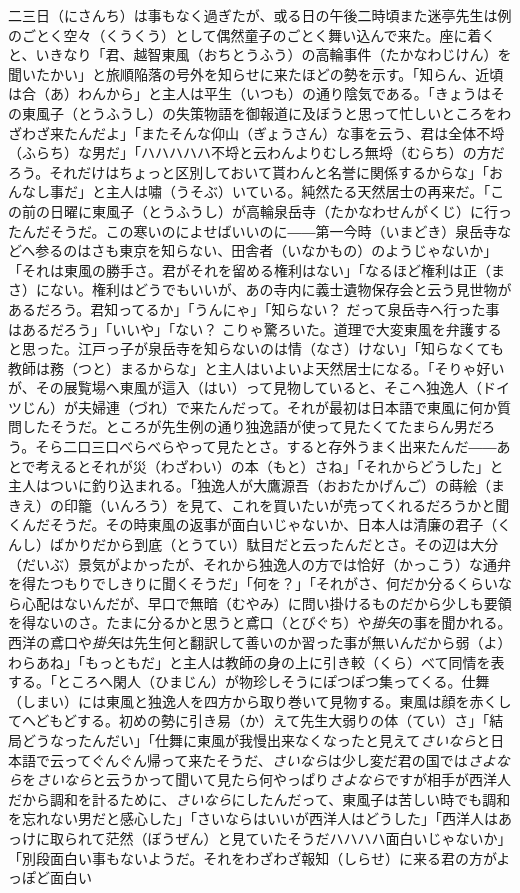 \documentclass{book}
\begin{document}
二三日（にさんち）は事もなく過ぎたが、或る日の午後二時頃また迷亭先生は例のごとく空々（くうくう）として偶然童子のごとく舞い込んで来た。座に着くと、いきなり「君、越智東風（おちとうふう）の高輪事件（たかなわじけん）を聞いたかい」と旅順陥落の号外を知らせに来たほどの勢を示す。「知らん、近頃は合（あ）わんから」と主人は平生（いつも）の通り陰気である。「きょうはその東風子（とうふうし）の失策物語を御報道に及ぼうと思って忙しいところをわざわざ来たんだよ」「またそんな仰山（ぎょうさん）な事を云う、君は全体不埒（ふらち）な男だ」「ハハハハハ不埒と云わんよりむしろ無埒（むらち）の方だろう。それだけはちょっと区別しておいて貰わんと名誉に関係するからな」「おんなし事だ」と主人は嘯（うそぶ）いている。純然たる天然居士の再来だ。「この前の日曜に東風子（とうふうし）が高輪泉岳寺（たかなわせんがくじ）に行ったんだそうだ。この寒いのによせばいいのに――第一今時（いまどき）泉岳寺などへ参るのはさも東京を知らない、田舎者（いなかもの）のようじゃないか」「それは東風の勝手さ。君がそれを留める権利はない」「なるほど権利は正（まさ）にない。権利はどうでもいいが、あの寺内に義士遺物保存会と云う見世物があるだろう。君知ってるか」「うんにゃ」「知らない？ だって泉岳寺へ行った事はあるだろう」「いいや」「ない？ こりゃ驚ろいた。道理で大変東風を弁護すると思った。江戸っ子が泉岳寺を知らないのは情（なさ）けない」「知らなくても教師は務（つと）まるからな」と主人はいよいよ天然居士になる。「そりゃ好いが、その展覧場へ東風が這入（はい）って見物していると、そこへ独逸人（ドイツじん）が夫婦連（づれ）で来たんだって。それが最初は日本語で東風に何か質問したそうだ。ところが先生例の通り独逸語が使って見たくてたまらん男だろう。そら二口三口べらべらやって見たとさ。すると存外うまく出来たんだ――あとで考えるとそれが災（わざわい）の本（もと）さね」「それからどうした」と主人はついに釣り込まれる。「独逸人が大鷹源吾（おおたかげんご）の蒔絵（まきえ）の印籠（いんろう）を見て、これを買いたいが売ってくれるだろうかと聞くんだそうだ。その時東風の返事が面白いじゃないか、日本人は清廉の君子（くんし）ばかりだから到底（とうてい）駄目だと云ったんだとさ。その辺は大分（だいぶ）景気がよかったが、それから独逸人の方では恰好（かっこう）な通弁を得たつもりでしきりに聞くそうだ」「何を？」「それがさ、何だか分るくらいなら心配はないんだが、早口で無暗（むやみ）に問い掛けるものだから少しも要領を得ないのさ。たまに分るかと思うと鳶口（とびぐち）や\emph{掛矢}の事を聞かれる。西洋の鳶口や\emph{掛矢}は先生何と翻訳して善いのか習った事が無いんだから弱（よ）わらあね」「もっともだ」と主人は教師の身の上に引き較（くら）べて同情を表する。「ところへ閑人（ひまじん）が物珍しそうにぽつぽつ集ってくる。仕舞（しまい）には東風と独逸人を四方から取り巻いて見物する。東風は顔を赤くしてへどもどする。初めの勢に引き易（か）えて先生大弱りの体（てい）さ」「結局どうなったんだい」「仕舞に東風が我慢出来なくなったと見えて\emph{さいなら}と日本語で云ってぐんぐん帰って来たそうだ、\emph{さいなら}は少し変だ君の国では\emph{さよなら}を\emph{さいなら}と云うかって聞いて見たら何やっぱり\emph{さよなら}ですが相手が西洋人だから調和を計るために、\emph{さいなら}にしたんだって、東風子は苦しい時でも調和を忘れない男だと感心した」「さいならはいいが西洋人はどうした」「西洋人はあっけに取られて茫然（ぼうぜん）と見ていたそうだハハハハ面白いじゃないか」「別段面白い事もないようだ。それをわざわざ報知（しらせ）に来る君の方がよっぽど面白い
\end{document}
